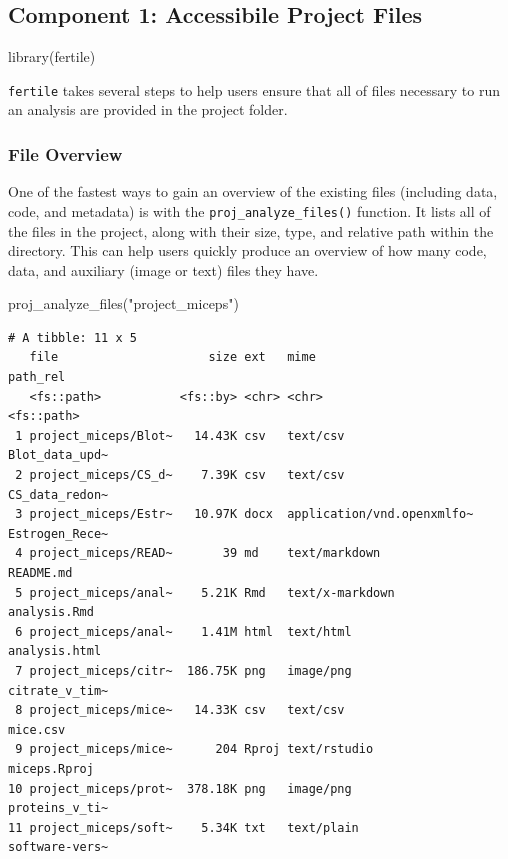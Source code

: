 \documentclass[12pt,twoside]{reedthesis}
\newenvironment{Shaded}{\begin{snugshade}}{\end{snugshade}}
\newcommand{\FunctionTok}[1]{\textcolor[rgb]{0.00,0.00,0.00}{#1}}
\newcommand{\NormalTok}[1]{#1}
\newcommand{\StringTok}[1]{\textcolor[rgb]{0.31,0.60,0.02}{#1}}
\begin{document}
\hypertarget{component-1-accessibile-project-files}{%
\subsection{Component 1: Accessibile Project Files}\label{component-1-accessibile-project-files}}
\begin{Shaded}
\begin{Highlighting}[]
\FunctionTok{library}\NormalTok{(fertile)}
\end{Highlighting}
\end{Shaded}
\texttt{fertile} takes several steps to help users ensure that all of files necessary to run an analysis are provided in the project folder.

\hypertarget{file-overview}{%
\subsubsection{File Overview}\label{file-overview}}

One of the fastest ways to gain an overview of the existing files (including data, code, and metadata) is with the \texttt{proj\_analyze\_files()} function. It lists all of the files in the project, along with their size, type, and relative path within the directory. This can help users quickly produce an overview of how many code, data, and auxiliary (image or text) files they have.
\begin{Shaded}
\begin{Highlighting}[]
\FunctionTok{proj\_analyze\_files}\NormalTok{(}\StringTok{"project\_miceps"}\NormalTok{)}
\end{Highlighting}
\end{Shaded}
\footnotesize
\begin{verbatim}
# A tibble: 11 x 5
   file                     size ext   mime                       path_rel      
   <fs::path>           <fs::by> <chr> <chr>                      <fs::path>    
 1 project_miceps/Blot~   14.43K csv   text/csv                   Blot_data_upd~
 2 project_miceps/CS_d~    7.39K csv   text/csv                   CS_data_redon~
 3 project_miceps/Estr~   10.97K docx  application/vnd.openxmlfo~ Estrogen_Rece~
 4 project_miceps/READ~       39 md    text/markdown              README.md     
 5 project_miceps/anal~    5.21K Rmd   text/x-markdown            analysis.Rmd  
 6 project_miceps/anal~    1.41M html  text/html                  analysis.html 
 7 project_miceps/citr~  186.75K png   image/png                  citrate_v_tim~
 8 project_miceps/mice~   14.33K csv   text/csv                   mice.csv      
 9 project_miceps/mice~      204 Rproj text/rstudio               miceps.Rproj  
10 project_miceps/prot~  378.18K png   image/png                  proteins_v_ti~
11 project_miceps/soft~    5.34K txt   text/plain                 software-vers~
\end{verbatim}
\normalsize
\end{document}
